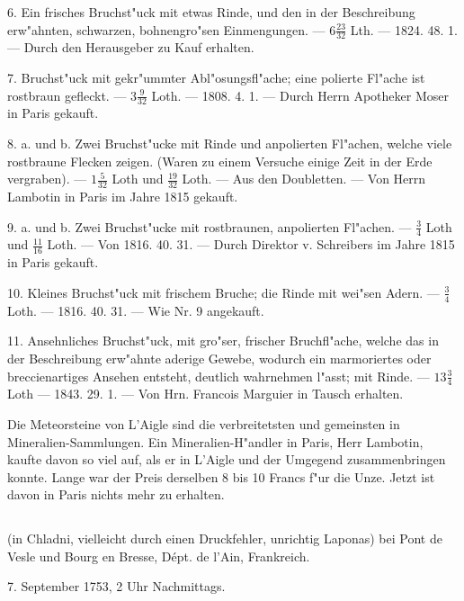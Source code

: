 \documentclass[a4paper, 11pt, oneside, polutonikogreek, german]{article}
\begin{document}
6. Ein frisches Bruchst"uck mit etwas Rinde, und den in der Beschreibung erw"ahnten, schwarzen, bohnengro"sen Einmengungen. --- $\mathfrak{6\frac{23}{32}}$ Lth. --- 1824. 48. 1. --- Durch den Herausgeber zu Kauf erhalten.

7. Bruchst"uck mit gekr"ummter Abl"osungsfl"ache; eine polierte Fl"ache ist rostbraun gefleckt. --- $\mathfrak{3\frac{9}{32}}$ Loth. --- 1808. 4. 1. --- Durch Herrn Apotheker Moser in Paris gekauft.

8. a. und b. Zwei Bruchst"ucke mit Rinde und anpolierten Fl"achen, welche viele rostbraune Flecken zeigen. (Waren zu einem Versuche einige Zeit in der Erde vergraben). --- $\mathfrak{1\frac{5}{32}}$ Loth und $\mathfrak{\frac{19}{32}}$ Loth. --- Aus den Doubletten. --- Von Herrn Lambotin in Paris im Jahre 1815 gekauft.

9. a. und b. Zwei Bruchst"ucke mit rostbraunen, anpolierten Fl"achen. --- $\mathfrak{\frac{3}{4}}$ Loth und $\mathfrak{\frac{11}{16}}$ Loth. --- Von 1816. 40. 31. --- Durch Direktor v. Schreibers im Jahre 1815 in Paris gekauft.

10. Kleines Bruchst"uck mit frischem Bruche; die Rinde mit wei"sen Adern. --- $\mathfrak{\frac{3}{4}}$ Loth. --- 1816. 40. 31. --- Wie Nr. 9 angekauft.

11. Ansehnliches Bruchst"uck, mit gro"ser, frischer Bruchfl"ache, welche das in der Beschreibung erw"ahnte aderige Gewebe, wodurch ein marmoriertes oder breccienartiges Ansehen entsteht, deutlich wahrnehmen l"asst; mit Rinde. --- $\mathfrak{13\frac{3}{4}}$ Loth --- 1843. 29. 1. --- Von Hrn. Francois Marguier in Tausch erhalten.

\setlength{\leftskip}{10mm}
\setlength{\parindent}{0pt}

{\footnotesize Die Meteorsteine von L’Aigle sind die verbreitetsten und gemeinsten in Mineralien-Sammlungen. Ein Mineralien-H"andler in Paris, Herr Lambotin, kaufte davon so viel auf, als er in L’Aigle und der Umgegend zusammenbringen konnte. Lange war der Preis derselben 8 bis 10 Francs f"ur die Unze. Jetzt ist davon in Paris nichts mehr zu erhalten.}

\setlength{\leftskip}{0pt}
\setlength{\parindent}{20pt}

\subsection[\swabfamily {Liponas.}]{}
\begin{center}

(in Chladni, vielleicht durch einen Druckfehler, unrichtig Laponas) bei Pont de Vesle und Bourg en Bresse, Dépt. de l'Ain, Frankreich.

7. September 1753, 2 Uhr Nachmittags.
\end{center}
\end{document}
